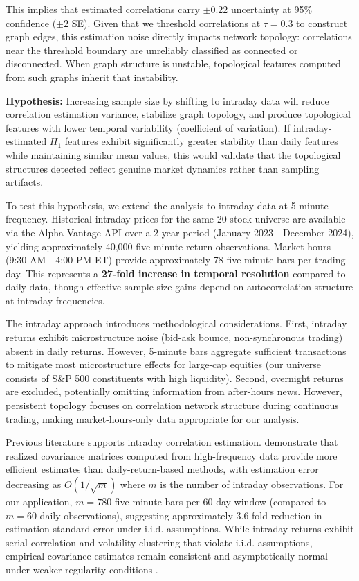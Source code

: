 This implies that estimated correlations carry $\pm 0.22$ uncertainty at 95\% confidence ($\pm 2$ SE). Given that we threshold correlations at $\tau = 0.3$ to construct graph edges, this estimation noise directly impacts network topology: correlations near the threshold boundary are unreliably classified as connected or disconnected. When graph structure is unstable, topological features computed from such graphs inherit that instability.

\textbf{Hypothesis:} Increasing sample size by shifting to intraday data will reduce correlation estimation variance, stabilize graph topology, and produce topological features with lower temporal variability (coefficient of variation). If intraday-estimated $H_1$ features exhibit significantly greater stability than daily features while maintaining similar mean values, this would validate that the topological structures detected reflect genuine market dynamics rather than sampling artifacts.

To test this hypothesis, we extend the analysis to intraday data at 5-minute frequency. Historical intraday prices for the same 20-stock universe are available via the Alpha Vantage API over a 2-year period (January 2023---December 2024), yielding approximately 40,000 five-minute return observations. Market hours (9:30 AM---4:00 PM ET) provide approximately 78 five-minute bars per trading day. This represents a \textbf{27-fold increase in temporal resolution} compared to daily data, though effective sample size gains depend on autocorrelation structure at intraday frequencies.

The intraday approach introduces methodological considerations. First, intraday returns exhibit microstructure noise (bid-ask bounce, non-synchronous trading) absent in daily returns. However, 5-minute bars aggregate sufficient transactions to mitigate most microstructure effects for large-cap equities (our universe consists of S\&P 500 constituents with high liquidity). Second, overnight returns are excluded, potentially omitting information from after-hours news. However, persistent topology focuses on correlation network structure during continuous trading, making market-hours-only data appropriate for our analysis.

Previous literature supports intraday correlation estimation. \citet{Andersen2003} demonstrate that realized covariance matrices computed from high-frequency data provide more efficient estimates than daily-return-based methods, with estimation error decreasing as $O(1/\sqrt{m})$ where $m$ is the number of intraday observations. For our application, $m = 780$ five-minute bars per 60-day window (compared to $m = 60$ daily observations), suggesting approximately 3.6-fold reduction in estimation standard error under i.i.d. assumptions. While intraday returns exhibit serial correlation and volatility clustering that violate i.i.d. assumptions, empirical covariance estimates remain consistent and asymptotically normal under weaker regularity conditions \citep{BarndorffNielsen2004}.

